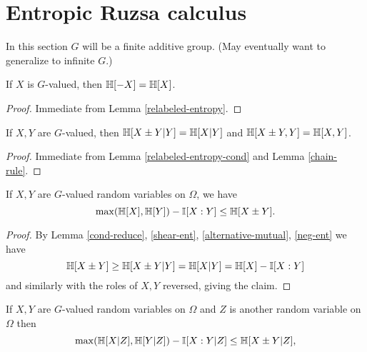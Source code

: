 \chapter{Entropic Ruzsa calculus}

In this section $G$ will be a finite additive group.  (May eventually want to generalize to infinite $G$.)

\begin{lemma}\label{neg-ent}
  \leanok
  If $X$ is $G$-valued, then $\mathbb{H}[-X]=\mathbb{H}[X]$.
\end{lemma}

\begin{proof}
  \leanok Immediate from Lemma \ref{relabeled-entropy}.
\end{proof}

\begin{lemma}\label{shear-ent}
  \leanok
  If $X,Y$ are $G$-valued, then $\mathbb{H}[X \pm Y | Y]=\mathbb{H}[X|Y]$ and $\mathbb{H}[X \pm Y, Y] = \mathbb{H}[X, Y]$.
\end{lemma}

\begin{proof}
  \leanok Immediate from Lemma \ref{relabeled-entropy-cond} and Lemma \ref{chain-rule}.
\end{proof}

\begin{lemma}\label{sumset-lower-gen}
  \leanok
  If $X,Y$ are $G$-valued random variables on $\Omega$, we have
$$ \max(\mathbb{H}[X], \mathbb{H}[Y]) -  \mathbb{I}[X:Y] \leq \mathbb{H}[X \pm Y].$$
\end{lemma}

\begin{proof} \leanok
    By Lemma \ref{cond-reduce}, \ref{shear-ent}, \ref{alternative-mutual}, \ref{neg-ent} we have
$$
 \mathbb{H}[X\pm Y] \geq \mathbb{H}[X\pm Y|Y] = \mathbb{H}[X|Y]= \mathbb{H}[X] -  \mathbb{I}[X:Y]
$$
and similarly with the roles of $X,Y$ reversed, giving the claim.
\end{proof}

\begin{corollary}\label{sumset-lower-gen-cond}
  \leanok
  If $X,Y$ are $G$-valued random variables on $\Omega$ and $Z$ is another random variable on $\Omega$ then
\[
  \max(\mathbb{H}[X|Z], \mathbb{H}[Y|Z]) -  \mathbb{I}[X:Y|Z] \leq \mathbb{H}[X\pm Y|Z],
\]
\end{corollary}

